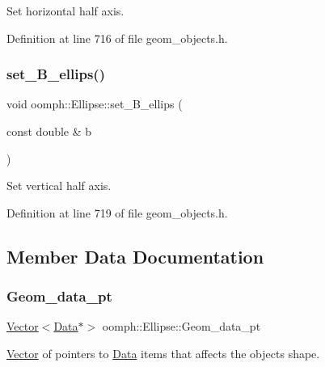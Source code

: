 Set horizontal half axis. 



Definition at line 716 of file geom\+\_\+objects.\+h.

\mbox{\label{classoomph_1_1Ellipse_a8c974f20a6e82951f07c66b3687550d2}} 
\subsubsection{\texorpdfstring{set\+\_\+\+B\+\_\+ellips()}{set\_B\_ellips()}}
{\footnotesize\ttfamily void oomph\+::\+Ellipse\+::set\+\_\+\+B\+\_\+ellips (\begin{DoxyParamCaption}\item[{const double \&}]{b }\end{DoxyParamCaption})\hspace{0.3cm}{\ttfamily [inline]}}



Set vertical half axis. 



Definition at line 719 of file geom\+\_\+objects.\+h.



\subsection{Member Data Documentation}
\mbox{\label{classoomph_1_1Ellipse_ae46cd009a73386dc3423378d8a0065de}} 
\subsubsection{\texorpdfstring{Geom\+\_\+data\+\_\+pt}{Geom\_data\_pt}}
{\footnotesize\ttfamily \hyperlink{classoomph_1_1Vector}{Vector}$<$\hyperlink{classoomph_1_1Data}{Data}$\ast$$>$ oomph\+::\+Ellipse\+::\+Geom\+\_\+data\+\_\+pt\hspace{0.3cm}{\ttfamily [private]}}



\hyperlink{classoomph_1_1Vector}{Vector} of pointers to \hyperlink{classoomph_1_1Data}{Data} items that affects the object\textquotesingle{}s shape. 



